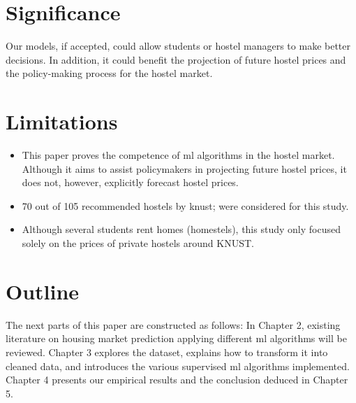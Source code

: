 \begin{sloppypar}
		
		\section{Significance}
		Our models, if accepted, could allow students or hostel managers to make better decisions. In addition, it could benefit the projection of future hostel prices and the policy-making process for the hostel market.
		
		
		\section{Limitations}
		\begin{itemize}%
			\item This paper proves the competence of \ac{ml} algorithms in the hostel market. Although it aims to assist policymakers in projecting future hostel prices, it does not, however, explicitly forecast hostel prices.
			
			\item 70 out of 105 recommended hostels by \ac{knust}; were considered for this study.
			
			\item Although several students rent homes (homestels), this study only focused solely on the prices of private hostels around KNUST. 
		\end{itemize}	
		
		\section{Outline}
		The next parts of this paper are constructed as follows: In Chapter 2, existing literature on housing market prediction applying different \ac{ml} algorithms will be reviewed. Chapter 3 explores the dataset, explains how to transform it into cleaned data, and introduces the various supervised \ac{ml} algorithms implemented. Chapter 4 presents our empirical results and the conclusion deduced in Chapter 5.
			
\end{sloppypar}